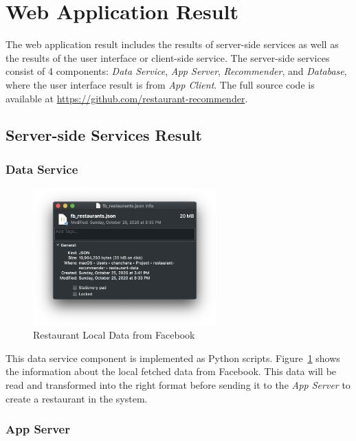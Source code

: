 \documentclass[12pt,oneside,openright,a4paper]{cpe-english-project}
\begin{document}
\section{Web Application Result}

The web application result includes the results of server-side services as well as the results of the user interface or client-side service. The server-side services consist of 4 components: \textit{Data Service}, \textit{App Server}, \textit{Recommender}, and \textit{Database}, where the user interface result is from \textit{App Client}. The full source code is available at \url{https://github.com/restaurant-recommender}.

\subsection{Server-side Services Result}

\subsubsection{Data Service}

\begin{figure}[H]\centering
\includegraphics[width=200pt]{./images/4result_dataservice.png}
\caption{Restaurant Local Data from Facebook}\label{fig:4result_dataservice}
\end{figure}\vspace{-24pt}

This data service component is implemented as Python scripts. Figure~\ref{fig:4result_dataservice} shows the information about the local fetched data from Facebook. This data will be read and transformed into the right format before sending it to the \textit{App Server} to create a restaurant in the system.

\subsubsection{App Server}
\end{document}
